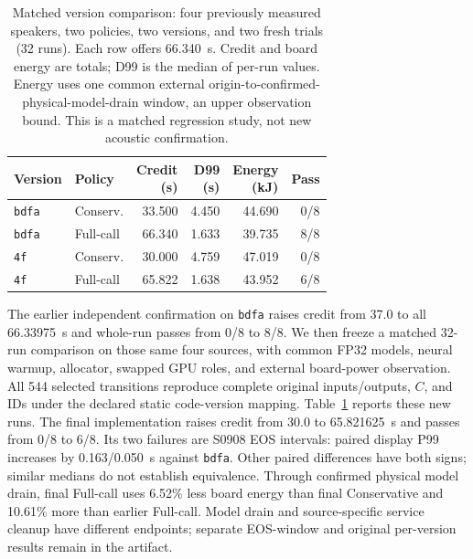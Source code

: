 \begin{table}[t]
\centering
\caption{Matched version comparison: four previously measured speakers,
two policies, two versions, and two fresh trials (32 runs).
Each row offers 66.340~s. Credit and board energy are totals;
D99 is the median of per-run values. Energy uses one common external
origin-to-confirmed-physical-model-drain window, an upper observation
bound. This is a matched regression study, not new acoustic confirmation.}
\label{tab:native_full_confirm}
\small
\setlength{\tabcolsep}{2.5pt}
\begin{tabular}{@{}llrrrr@{}}
\toprule
Version & Policy & \shortstack{Credit\\(s)} & \shortstack{D99\\(s)} &
\shortstack{Energy\\(kJ)} & Pass\\
\midrule
\texttt{bdfa} & Conserv. & 33.500 & 4.450 & 44.690 & 0/8\\
\texttt{bdfa} & Full-call & 66.340 & 1.633 & 39.735 & 8/8\\
\texttt{4f} & Conserv. & 30.000 & 4.759 & 47.019 & 0/8\\
\texttt{4f} & Full-call & 65.822 & 1.638 & 43.952 & 6/8\\
\bottomrule
\end{tabular}
\end{table}

The earlier independent confirmation on \texttt{bdfa} raises credit from
37.0 to all 66.33975~s and whole-run passes from 0/8 to 8/8.
We then freeze a matched 32-run comparison on those same four sources,
with common FP32 models, neural warmup, allocator, swapped GPU roles,
and external board-power observation. All 544 selected transitions
reproduce complete original inputs/outputs, $C$, and IDs under the
declared static code-version mapping. Table~\ref{tab:native_full_confirm}
reports these new runs. The final implementation raises credit from
30.0 to 65.821625~s and passes from 0/8 to 6/8. Its two failures are
S0908 EOS intervals: paired display P99 increases by 0.163/0.050~s
against \texttt{bdfa}. Other paired differences have both signs;
similar medians do not establish equivalence. Through confirmed physical
model drain, final Full-call uses 6.52\% less board energy than final
Conservative and 10.61\% more than earlier Full-call. Model drain and
source-specific service cleanup have different endpoints; separate
EOS-window and original per-version results remain in the artifact.

